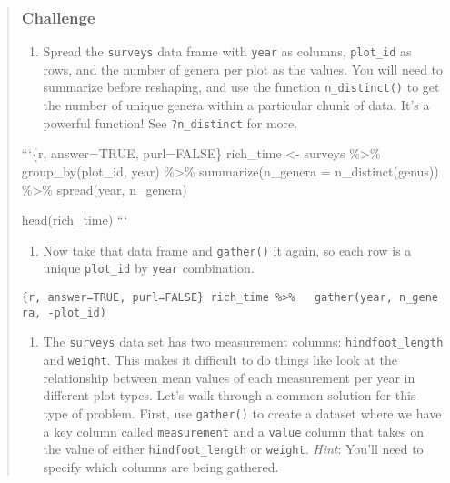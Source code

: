 \documentclass[]{article}
\providecommand{\tightlist}{%
  \setlength{\itemsep}{0pt}\setlength{\parskip}{0pt}}
\begin{document}
\begin{quote}
\subsubsection{Challenge}\label{challenge-3}

\begin{enumerate}
\def\labelenumi{\arabic{enumi}.}
\tightlist
\item
  Spread the \texttt{surveys} data frame with \texttt{year} as columns,
  \texttt{plot\_id} as rows, and the number of genera per plot as the
  values. You will need to summarize before reshaping, and use the
  function \texttt{n\_distinct()} to get the number of unique genera
  within a particular chunk of data. It's a powerful function! See
  \texttt{?n\_distinct} for more.
\end{enumerate}

```\{r, answer=TRUE, purl=FALSE\} rich\_time \textless{}- surveys
\%\textgreater{}\% group\_by(plot\_id, year) \%\textgreater{}\%
summarize(n\_genera = n\_distinct(genus)) \%\textgreater{}\%
spread(year, n\_genera)

head(rich\_time) ```

\begin{enumerate}
\def\labelenumi{\arabic{enumi}.}
\setcounter{enumi}{1}
\tightlist
\item
  Now take that data frame and \texttt{gather()} it again, so each row
  is a unique \texttt{plot\_id} by \texttt{year} combination.
\end{enumerate}

\texttt{\{r,\ answer=TRUE,\ purl=FALSE\}\ rich\_time\ \%\textgreater{}\%\ \ \ gather(year,\ n\_genera,\ -plot\_id)}

\begin{enumerate}
\def\labelenumi{\arabic{enumi}.}
\setcounter{enumi}{2}
\tightlist
\item
  The \texttt{surveys} data set has two measurement columns:
  \texttt{hindfoot\_length} and \texttt{weight}. This makes it difficult
  to do things like look at the relationship between mean values of each
  measurement per year in different plot types. Let's walk through a
  common solution for this type of problem. First, use \texttt{gather()}
  to create a dataset where we have a key column called
  \texttt{measurement} and a \texttt{value} column that takes on the
  value of either \texttt{hindfoot\_length} or \texttt{weight}.
  \emph{Hint}: You'll need to specify which columns are being gathered.
\end{enumerate}


\end{quote}
\end{document}
